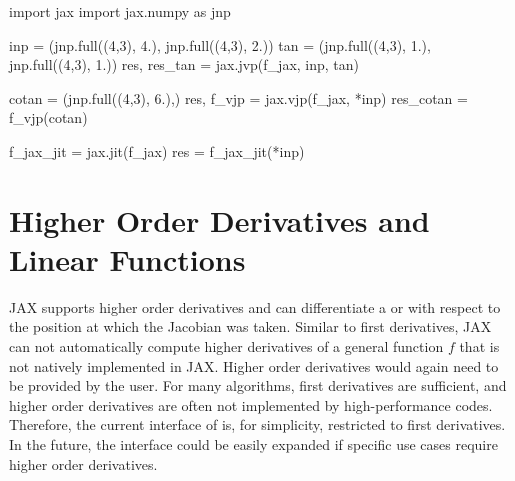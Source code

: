 \documentclass[10pt,a4paper,onecolumn]{article}
\let\textttOrig=\texttt
\def\texttt#1{\expandafter\textttOrig{\seqsplit{#1}}}
\newenvironment{Shaded}{}{}
\newcommand{\DecValTok}[1]{\textcolor[rgb]{0.25,0.63,0.44}{#1}}
\newcommand{\FloatTok}[1]{\textcolor[rgb]{0.25,0.63,0.44}{#1}}
\newcommand{\ImportTok}[1]{#1}
\newcommand{\NormalTok}[1]{#1}
\newcommand{\OperatorTok}[1]{\textcolor[rgb]{0.40,0.40,0.40}{#1}}
\begin{document}
\begin{Shaded}
\begin{Highlighting}[]
\ImportTok{import}\NormalTok{ jax}
\ImportTok{import}\NormalTok{ jax.numpy }\ImportTok{as}\NormalTok{ jnp}

\NormalTok{inp }\OperatorTok{=}\NormalTok{ (jnp.full((}\DecValTok{4}\NormalTok{,}\DecValTok{3}\NormalTok{), }\FloatTok{4.}\NormalTok{), jnp.full((}\DecValTok{4}\NormalTok{,}\DecValTok{3}\NormalTok{), }\FloatTok{2.}\NormalTok{))}
\NormalTok{tan }\OperatorTok{=}\NormalTok{ (jnp.full((}\DecValTok{4}\NormalTok{,}\DecValTok{3}\NormalTok{), }\FloatTok{1.}\NormalTok{), jnp.full((}\DecValTok{4}\NormalTok{,}\DecValTok{3}\NormalTok{), }\FloatTok{1.}\NormalTok{))}
\NormalTok{res, res\_tan }\OperatorTok{=}\NormalTok{ jax.jvp(f\_jax, inp, tan)}

\NormalTok{cotan }\OperatorTok{=}\NormalTok{ (jnp.full((}\DecValTok{4}\NormalTok{,}\DecValTok{3}\NormalTok{), }\FloatTok{6.}\NormalTok{),)}
\NormalTok{res, f\_vjp }\OperatorTok{=}\NormalTok{ jax.vjp(f\_jax, }\OperatorTok{*}\NormalTok{inp)}
\NormalTok{res\_cotan }\OperatorTok{=}\NormalTok{ f\_vjp(cotan)}

\NormalTok{f\_jax\_jit }\OperatorTok{=}\NormalTok{ jax.jit(f\_jax)}
\NormalTok{res }\OperatorTok{=}\NormalTok{ f\_jax\_jit(}\OperatorTok{*}\NormalTok{inp)}
\end{Highlighting}
\end{Shaded}

\hypertarget{higher-order-derivatives-and-linear-functions}{%
\section{Higher Order Derivatives and Linear
Functions}\label{higher-order-derivatives-and-linear-functions}}

JAX supports higher order derivatives and can differentiate a
\texttt{jvp} or \texttt{vjp} with respect to the position at which the
Jacobian was taken. Similar to first derivatives, JAX can not
automatically compute higher derivatives of a general function \(f\)
that is not natively implemented in JAX. Higher order derivatives would
again need to be provided by the user. For many algorithms, first
derivatives are sufficient, and higher order derivatives are often not
implemented by high-performance codes. Therefore, the current
interface of \texttt{JAXbind} is, for simplicity, restricted to first
derivatives. In the future, the interface could be easily expanded if
specific use cases require higher order derivatives.
\end{document}
